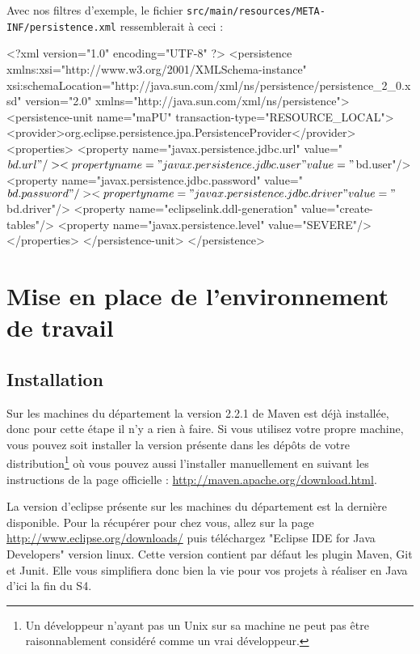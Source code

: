 \documentclass[a4paper,11pt]{article}
\begin{document}
Avec nos filtres d'exemple, le fichier \texttt{src/main/resources/META-INF/persistence.xml} ressemblerait à ceci :
\begin{code_xml}
<?xml version="1.0" encoding="UTF-8" ?>
<persistence xmlns:xsi="http://www.w3.org/2001/XMLSchema-instance" 
             xsi:schemaLocation="http://java.sun.com/xml/ns/persistence/persistence_2_0.xsd" version="2.0" 
             xmlns="http://java.sun.com/xml/ns/persistence">
  <persistence-unit name="maPU" transaction-type="RESOURCE_LOCAL">
    <provider>org.eclipse.persistence.jpa.PersistenceProvider</provider>
    <properties>
      <property name="javax.persistence.jdbc.url" value="${bd.url}"/>
      <property name="javax.persistence.jdbc.user" value="${bd.user}"/>
      <property name="javax.persistence.jdbc.password" value="${bd.password}"/>
      <property name="javax.persistence.jdbc.driver" value="${bd.driver}"/>
      <property name="eclipselink.ddl-generation" value="create-tables"/>
      <property name="javax.persistence.level" value="SEVERE"/>
    </properties>
  </persistence-unit>
</persistence>
\end{code_xml}

\section{Mise en place de l'environnement de travail}
\subsection{Installation}
Sur les machines du département la version 2.2.1 de Maven est déjà installée, donc pour cette étape il n'y a rien à faire.
Si vous utilisez votre propre machine, vous pouvez soit installer la version présente dans les dépôts de votre 
distribution\footnote{Un développeur n'ayant pas un Unix sur sa machine ne peut pas être raisonnablement considéré comme un vrai développeur.}
où vous pouvez aussi l'installer manuellement en suivant les instructions de la page officielle : \url{http://maven.apache.org/download.html}.

La version d'eclipse présente sur les machines du département est la dernière disponible. Pour la récupérer pour chez vous, 
allez sur la page \url{http://www.eclipse.org/downloads/} puis téléchargez "Eclipse IDE for Java Developers" version linux. 
Cette version contient par défaut les plugin Maven, Git et Junit. Elle vous simplifiera donc bien la vie pour vos projets 
à réaliser en Java d'ici la fin du S4.
\end{document}

